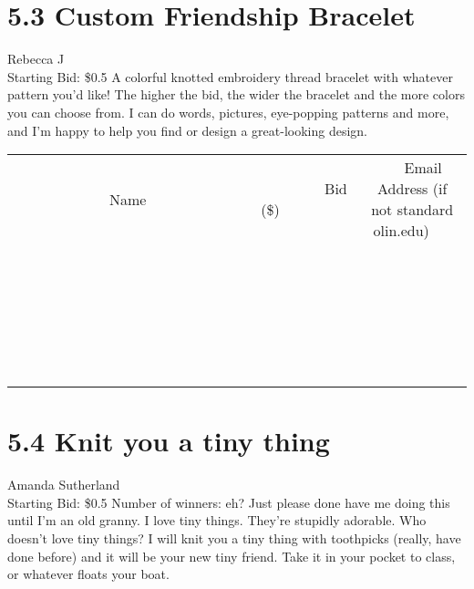 \documentclass[11pt]{article}
\begin{document}
\section*{5.3 Custom Friendship Bracelet}
Rebecca J
\\
Starting Bid: \$0.5
\newline
A colorful knotted embroidery thread bracelet with whatever pattern you'd like! The higher the bid, the wider the bracelet and the more colors you can choose from. I can do words, pictures, eye-popping patterns and more, and I'm happy to help you find or design a great-looking design.
\\[6ex]
\begin{tabular}{c c c}
~~~~~~~~~~~~~Name~~~~~~~~~~~~~ & ~~~~~~~~~Bid (\$)~~~~~~~~~  & ~~~Email Address (if not standard olin.edu)~~~\\
 & & \\
\hline
 & & \\
\hline
 & & \\
\hline
 & & \\
\hline
 & & \\
\hline
 & & \\
\hline
 & & \\
\hline
 & & \\
\hline
 & & \\
\hline
 & & \\
\hline
 & & \\
\hline
 & & \\
\hline
 & & \\
\hline
 & & \\
\hline
 & & \\
\hline
 & & \\
\hline
 & & \\
\hline
 & & \\
\hline
 & & \\
\hline
 & & \\
\hline
 & & \\
\hline
 & & \\
\hline
 & & \\
\hline
 & & \\
\hline
 & & \\
\hline
 & & \\
\hline
\end{tabular}
\newpage
\section*{5.4 Knit you a tiny thing}
Amanda Sutherland
\\
Starting Bid: \$0.5
\newline
Number of winners: eh? Just please done have me doing this until I'm an old granny. 
\newline
I love tiny things. They're stupidly adorable. Who doesn't love tiny things? I will knit you a tiny thing with toothpicks (really, have done before) and it will be your new tiny friend. Take it in your pocket to class, or whatever floats your boat. 
\end{document}
